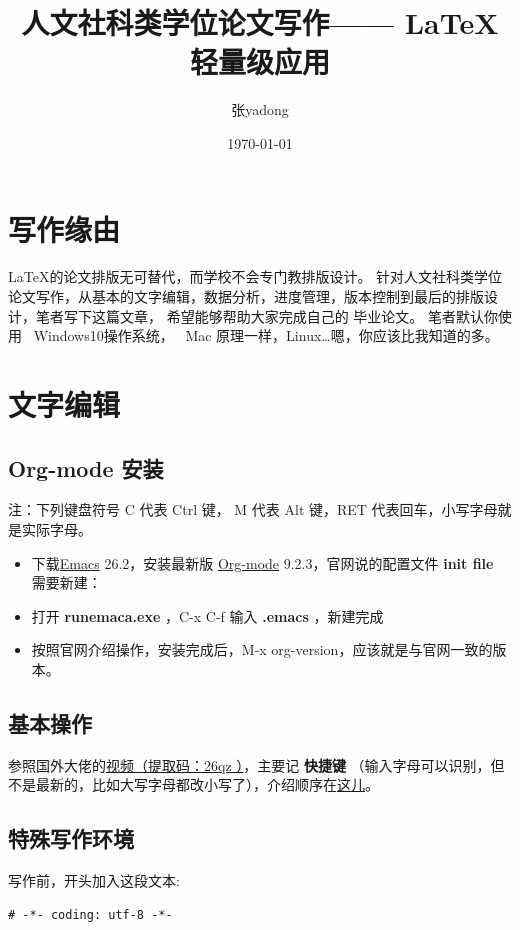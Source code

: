 \documentclass{ctexrep}
\author{张yadong}
\date{\today}
\title{人文社科类学位论文写作—— \LaTeX 轻量级应用}
\begin{document}
\maketitle
\tableofcontents



\section{写作缘由}
\label{sec:orgddf61dc}
\LaTeX{}的论文排版无可替代，而学校不会专门教排版设计。
针对人文社科类学位论文写作，从基本的文字编辑，数据分析，进度管理，版本控制到最后的排版设计，笔者写下这篇文章，
希望能够帮助大家完成自己的
毕业论文。
笔者默认你使用\faWindows~ Windows10操作系统，\faApple~ Mac 原理一样，Linux\ldots{}\faLinux 嗯，你应该比我知道的多。
\section{文字编辑}
\label{sec:org63c45b2}
\subsection{Org-mode 安装}
\label{sec:orgaaef9fc}
注：下列键盘符号 C 代表 Ctrl 键， M 代表 Alt 键，RET 代表回车，小写字母就是实际字母。

\begin{itemize}
\item 下载\href{https://www.gnu.org/software/emacs/download.html}{Emacs} 26.2，安装最新版 \href{https://orgmode.org/elpa.html}{Org-mode} 9.2.3，官网说的配置文件 \textbf{init file} 需要新建：
\item 打开 \textbf{runemaca.exe} ，C-x C-f 输入 \textbf{.emacs} ，新建完成
\item 按照官网介绍操作，安装完成后，M-x org-version，应该就是与官网一致的版本。
\end{itemize}
\subsection{基本操作}
\label{sec:orgad93b47}
参照国外大佬的\href{https://pan.baidu.com/s/1p6CRrnt6c0WrROvLW0BjRA }{视频（提取码：26qz ）}，主要记 \textbf{快捷键} （输入字母可以识别，但不是最新的，比如大写字母都改小写了），介绍顺序在\href{https://orgmode.org/worg/org-tutorials/org-screencasts/org-mode-google-tech-talk.html}{这儿}。
\subsection{特殊写作环境}
\label{sec:orgf18cb22}
写作前，开头加入这段文本:
\begin{verbatim}
# -*- coding: utf-8 -*-
\end{verbatim}
\end{document}
